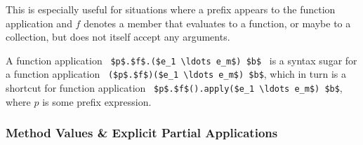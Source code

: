 This is especially useful for situations where a prefix appears to the function application and $f$ denotes a member that evaluates to a function, or maybe to a collection, but does not itself accept any arguments. 

A function application ~\lstinline!$p$.$f$.($e_1 \ldots e_m$) $b$!~ is a syntax sugar for a function application ~\lstinline!($p$.$f$)($e_1 \ldots e_m$) $b$!, which in turn is a shortcut for function application ~\lstinline!$p$.$f$().apply($e_1 \ldots e_m$) $b$!, where $p$ is some prefix expression. 






\subsubsection{Method Values \& Explicit Partial Applications}
\label{sec:method-values}

